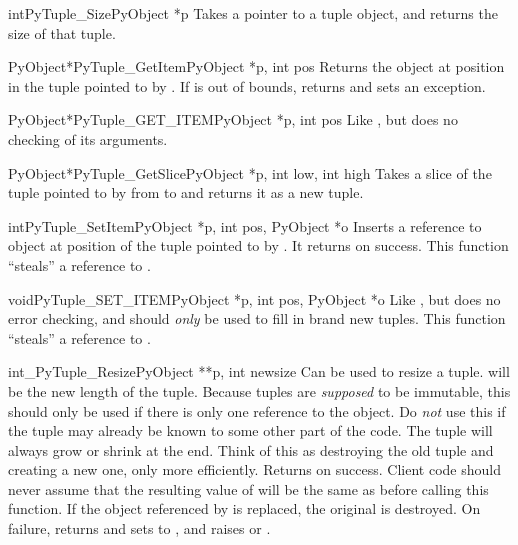 \documentclass{manual}
\begin{document}
\begin{cfuncdesc}{int}{PyTuple_Size}{PyObject *p}
Takes a pointer to a tuple object, and returns the size
of that tuple.
\end{cfuncdesc}

\begin{cfuncdesc}{PyObject*}{PyTuple_GetItem}{PyObject *p, int pos}
Returns the object at position  in the tuple pointed
to by .  If  is out of bounds, returns \NULL{} and
sets an  exception.
\end{cfuncdesc}

\begin{cfuncdesc}{PyObject*}{PyTuple_GET_ITEM}{PyObject *p, int pos}
Like , but does no checking of its
arguments.
\end{cfuncdesc}

\begin{cfuncdesc}{PyObject*}{PyTuple_GetSlice}{PyObject *p,
                                               int low, int high}
Takes a slice of the tuple pointed to by  from
 to  and returns it as a new tuple.
\end{cfuncdesc}

\begin{cfuncdesc}{int}{PyTuple_SetItem}{PyObject *p,
                                        int pos, PyObject *o}
Inserts a reference to object  at position  of
the tuple pointed to by . It returns  on success.
  This function ``steals'' a reference to .
\end{cfuncdesc}

\begin{cfuncdesc}{void}{PyTuple_SET_ITEM}{PyObject *p,
                                          int pos, PyObject *o}
Like , but does no error checking, and
should \emph{only} be used to fill in brand new tuples.
  This function ``steals'' a reference to .
\end{cfuncdesc}

\begin{cfuncdesc}{int}{_PyTuple_Resize}{PyObject **p, int newsize}
Can be used to resize a tuple.   will be the new length
of the tuple.  Because tuples are \emph{supposed} to be immutable,
this should only be used if there is only one reference to the object.
Do \emph{not} use this if the tuple may already be known to some other
part of the code.  The tuple will always grow or shrink at the end.
Think of this as destroying the old tuple and creating a new one, only
more efficiently.  Returns  on success.  Client code should
never assume that the resulting value of  will be the
same as before calling this function.  If the object referenced by
 is replaced, the original  is
destroyed.  On failure, returns  and sets  to
\NULL, and raises  or .
\end{cfuncdesc}
\end{document}
